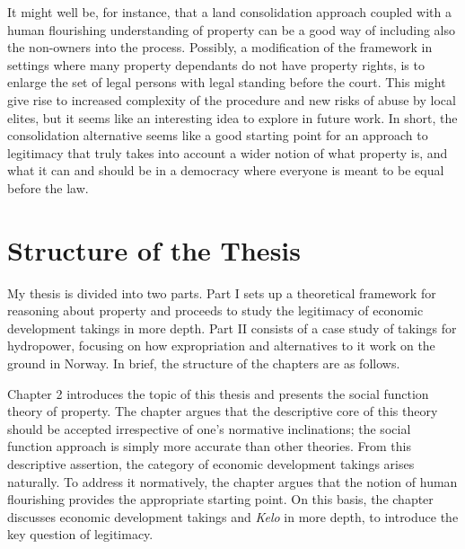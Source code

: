 It might well be, for instance, that a land consolidation approach coupled with a human flourishing understanding of property can be a good way of including also the non-owners into the process. Possibly, a modification of the framework in settings where many property dependants do not have property rights, is to enlarge the set of legal persons with legal standing before the court. This might give rise to increased complexity of the procedure and new risks of abuse by local elites, but it seems like an interesting idea to explore in future work. In short, the consolidation alternative seems like a good starting point for an approach to legitimacy that truly takes into account a wider notion of what property is, and what it can and should be in a democracy where everyone is meant to be equal before the law.


\section{Structure of the Thesis}\label{sec:1:5}

My thesis is divided into two parts. Part I sets up a theoretical framework for reasoning about property and proceeds to study the legitimacy of economic development takings in more depth. Part II consists of a case study of takings for hydropower, focusing on how expropriation and alternatives to it work on the ground in Norway. In brief, the structure of the chapters are as follows.

Chapter 2 introduces the topic of this thesis and presents the social function theory of property. The chapter argues that the descriptive core of this theory should be accepted irrespective of one's normative inclinations; the social function approach is simply more accurate than other theories. From this descriptive assertion, the category of economic development takings arises naturally. To address it normatively, the chapter argues that the notion of human flourishing provides the appropriate starting point. On this basis, the chapter discusses economic development takings and {\it Kelo} in more depth, to introduce the key question of legitimacy.

